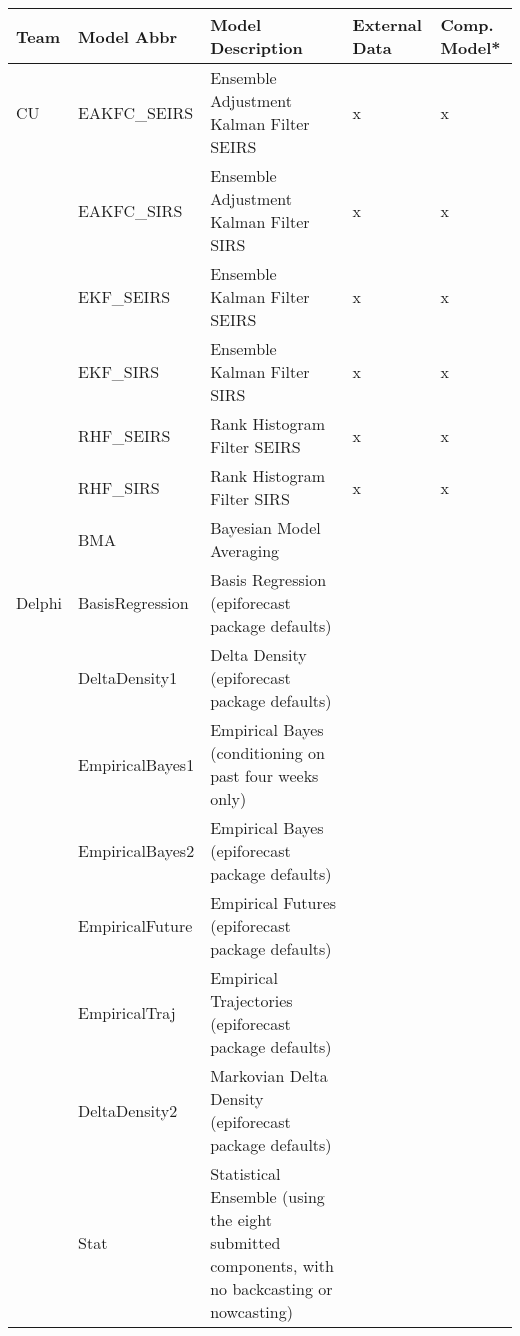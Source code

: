 \begin{table}
\setlength{\tabcolsep}{4pt} 
\begin{tabular}{p{1.69cm} l p{7.5cm}  p{1.70cm}  p{1.7cm}}
\hline
Team     & Model Abbr& Model Description & External Data & Comp. Model* \\ 
\hline
CU       & EAKFC\_SEIRS       & Ensemble Adjustment Kalman Filter SEIRS  & x & x    \\ 

~        & EAKFC\_SIRS        & Ensemble Adjustment Kalman Filter SIRS   & x & x \\
~        & EKF\_SEIRS         & Ensemble Kalman Filter SEIRS    & x             & x                   \\
~        & EKF\_SIRS          & Ensemble Kalman Filter SIRS     & x             & x                   \\
~        & RHF\_SEIRS         & Rank Histogram Filter SEIRS     & x             & x                   \\
~        & RHF\_SIRS          & Rank Histogram Filter SIRS      & x             & x                   \\
~        & BMA                & Bayesian Model Averaging       & ~             & ~                   \\
\hline
Delphi   & BasisRegression    & Basis Regression (epiforecast package defaults) & ~             & ~                   \\ 
~        & DeltaDensity1      & Delta Density (epiforecast package defaults)    & ~             & ~                   \\ 
~        & EmpiricalBayes1    & Empirical Bayes (conditioning on past four weeks only) & ~             & ~                   \\ 
~        & EmpiricalBayes2    & Empirical Bayes (epiforecast package defaults) & ~             & ~                   \\ 
~        & EmpiricalFuture    & Empirical Futures (epiforecast package defaults)    & ~             & ~                   \\ 
~        & EmpiricalTraj      & Empirical Trajectories (epiforecast package defaults) & ~             & ~                   \\ 
~        & DeltaDensity2      & Markovian Delta Density (epiforecast package defaults) & ~             & ~                   \\ 
~        & Stat               & Statistical Ensemble (using the eight submitted components, with no backcasting or nowcasting) & ~             & ~                   \\

\end{tabular}
\end{table}
